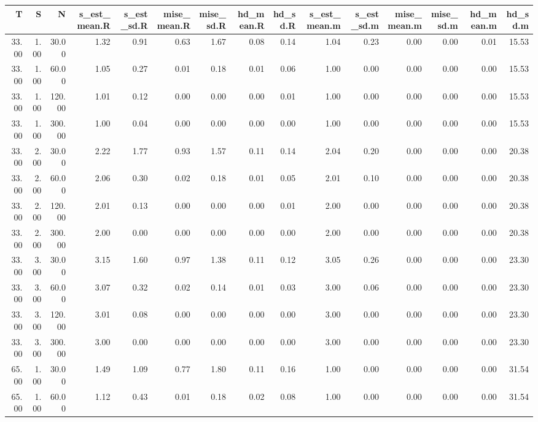 \begin{table}[ht]
\centering
\begin{tabular}{rrrrrrrrrrrrrrr}
  \hline
T & S & N & s\_est\_mean.R & s\_est\_sd.R & mise\_mean.R & mise\_sd.R & hd\_mean.R & hd\_sd.R & s\_est\_mean.m & s\_est\_sd.m & mise\_mean.m & mise\_sd.m & hd\_mean.m & hd\_sd.m \\ 
  \hline
33.00 & 1.00 & 30.00 & 1.32 & 0.91 & 0.63 & 1.67 & 0.08 & 0.14 & 1.04 & 0.23 & 0.00 & 0.00 & 0.01 & 15.53 \\ 
  33.00 & 1.00 & 60.00 & 1.05 & 0.27 & 0.01 & 0.18 & 0.01 & 0.06 & 1.00 & 0.00 & 0.00 & 0.00 & 0.00 & 15.53 \\ 
  33.00 & 1.00 & 120.00 & 1.01 & 0.12 & 0.00 & 0.00 & 0.00 & 0.01 & 1.00 & 0.00 & 0.00 & 0.00 & 0.00 & 15.53 \\ 
  33.00 & 1.00 & 300.00 & 1.00 & 0.04 & 0.00 & 0.00 & 0.00 & 0.00 & 1.00 & 0.00 & 0.00 & 0.00 & 0.00 & 15.53 \\ 
  33.00 & 2.00 & 30.00 & 2.22 & 1.77 & 0.93 & 1.57 & 0.11 & 0.14 & 2.04 & 0.20 & 0.00 & 0.00 & 0.00 & 20.38 \\ 
  33.00 & 2.00 & 60.00 & 2.06 & 0.30 & 0.02 & 0.18 & 0.01 & 0.05 & 2.01 & 0.10 & 0.00 & 0.00 & 0.00 & 20.38 \\ 
  33.00 & 2.00 & 120.00 & 2.01 & 0.13 & 0.00 & 0.00 & 0.00 & 0.01 & 2.00 & 0.00 & 0.00 & 0.00 & 0.00 & 20.38 \\ 
  33.00 & 2.00 & 300.00 & 2.00 & 0.00 & 0.00 & 0.00 & 0.00 & 0.00 & 2.00 & 0.00 & 0.00 & 0.00 & 0.00 & 20.38 \\ 
  33.00 & 3.00 & 30.00 & 3.15 & 1.60 & 0.97 & 1.38 & 0.11 & 0.12 & 3.05 & 0.26 & 0.00 & 0.00 & 0.00 & 23.30 \\ 
  33.00 & 3.00 & 60.00 & 3.07 & 0.32 & 0.02 & 0.14 & 0.01 & 0.03 & 3.00 & 0.06 & 0.00 & 0.00 & 0.00 & 23.30 \\ 
  33.00 & 3.00 & 120.00 & 3.01 & 0.08 & 0.00 & 0.00 & 0.00 & 0.00 & 3.00 & 0.00 & 0.00 & 0.00 & 0.00 & 23.30 \\ 
  33.00 & 3.00 & 300.00 & 3.00 & 0.00 & 0.00 & 0.00 & 0.00 & 0.00 & 3.00 & 0.00 & 0.00 & 0.00 & 0.00 & 23.30 \\ 
  65.00 & 1.00 & 30.00 & 1.49 & 1.09 & 0.77 & 1.80 & 0.11 & 0.16 & 1.00 & 0.00 & 0.00 & 0.00 & 0.00 & 31.54 \\ 
  65.00 & 1.00 & 60.00 & 1.12 & 0.43 & 0.01 & 0.18 & 0.02 & 0.08 & 1.00 & 0.00 & 0.00 & 0.00 & 0.00 & 31.54 \\ 

\end{tabular}
\end{table}
